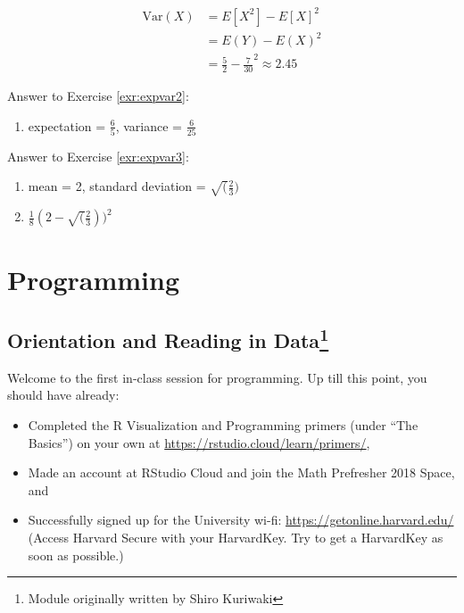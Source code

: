 \documentclass[]{book}
\providecommand{\tightlist}{%
  \setlength{\itemsep}{0pt}\setlength{\parskip}{0pt}}
\let\rmarkdownfootnote\footnote%
\def\footnote{\protect\rmarkdownfootnote}
\theoremstyle{definition}
\theoremstyle{definition}
\theoremstyle{definition}
\theoremstyle{remark}
\begin{document}
\begin{align*}
\text{Var}(X) &= E[X^2] - E[X]^2\\
&= E(Y) - E(X)^2\\
&= \frac{5}{2} - \frac{7}{30}^2 \approx 2.45
\end{align*}

Answer to Exercise \ref{exr:expvar2}:

\begin{enumerate}
\def\labelenumi{\arabic{enumi}.}
\tightlist
\item
  expectation = \(\frac{6}{5}\), variance = \(\frac{6}{25}\)
\end{enumerate}

Answer to Exercise \ref{exr:expvar3}:

\begin{enumerate}
\def\labelenumi{\arabic{enumi}.}
\item
  mean = 2, standard deviation = \(\sqrt(\frac{2}{3})\)
\item
  \(\frac{1}{8}(2 - \sqrt(\frac{2}{3}))^2\)
\end{enumerate}

\part{Programming}\label{part-programming}

\chapter[Orientation and Reading in Data]{\texorpdfstring{Orientation
and Reading in Data\footnote{Module originally written by Shiro Kuriwaki}}{Orientation and Reading in Data}}\label{dataimport}

Welcome to the first in-class session for programming. Up till this
point, you should have already:

\begin{itemize}
\tightlist
\item
  Completed the R Visualization and Programming primers (under ``The
  Basics'') on your own at \url{https://rstudio.cloud/learn/primers/},
\item
  Made an account at RStudio Cloud and join the Math Prefresher 2018
  Space, and
\item
  Successfully signed up for the University wi-fi:
  \url{https://getonline.harvard.edu/} (Access Harvard Secure with your
  HarvardKey. Try to get a HarvardKey as soon as possible.)
\end{itemize}
\end{document}
